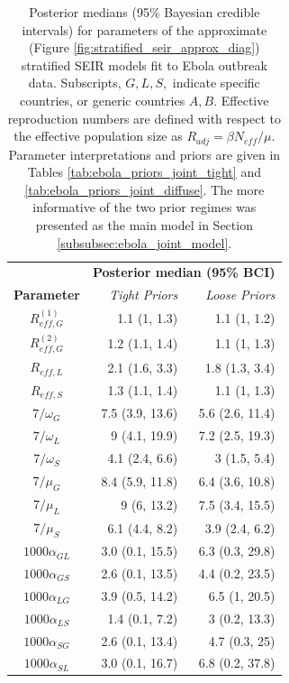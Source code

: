 \begin{table}[htbp]
	\caption[Posterior parameter estimates for stratified SEIR models fit Ebola outbreak data.]{Posterior medians (95\% Bayesian credible intervals) for parameters of the approximate (Figure \ref{fig:stratified_seir_approx_diag}) stratified SEIR models fit to Ebola outbreak data. Subscripts, $ G,L,S, $ indicate specific countries, or generic countries $ A,B $. Effective reproduction numbers are defined with respect to the effective population size as $ R_{adj} = \beta N_{eff} /\mu $. Parameter interpretations and priors are given in Tables \ref{tab:ebola_priors_joint_tight} and \ref{tab:ebola_priors_joint_diffuse}. The more informative of the two prior regimes was presented as the main model in Section \ref{subsubsec:ebola_joint_model}.}
	\label{tab:ebola_joint_ests}
	\centering\footnotesize
	\begin{tabular}{crr}
		\hline
		& \multicolumn{2}{c}{\textbf{Posterior median (95\% BCI)}}\\\cline{2-3}
		\textbf{Parameter} & \textit{Tight Priors} & \textit{Loose Priors} \\ 
		\hline
		$ R_{eff,G}^{(1)} $& 1.1 (1, 1.3) & 1.1 (1, 1.2) \\ 
		$ R_{eff,G}^{(2)} $& 1.2 (1.1, 1.4) & 1.1 (1, 1.3) \\ 
		$ R_{eff,L} $& 2.1 (1.6, 3.3) & 1.8 (1.3, 3.4) \\ 
		$ R_{eff,S} $& 1.3 (1.1, 1.4) & 1.1 (1, 1.3) \\ 
		$ 7/\omega_G $& 7.5 (3.9, 13.6) & 5.6 (2.6, 11.4) \\ 
		$ 7/\omega_L $& 9 (4.1, 19.9) & 7.2 (2.5, 19.3) \\ 
		$ 7/\omega_S $& 4.1 (2.4, 6.6) & 3 (1.5, 5.4) \\ 
		$ 7/\mu_G $& 8.4 (5.9, 11.8) & 6.4 (3.6, 10.8) \\ 
		$ 7/\mu_L $& 9 (6, 13.2) & 7.5 (3.4, 15.5) \\ 
		$ 7/\mu_S $& 6.1 (4.4, 8.2) & 3.9 (2.4, 6.2) \\ 
		$ 1000\alpha_{GL} $& 3.0 (0.1, 15.5) & 6.3 (0.3, 29.8) \\ 
		$ 1000\alpha_{GS} $& 2.6 (0.1, 13.5) & 4.4 (0.2, 23.5) \\ 
		$ 1000\alpha_{LG} $& 3.9 (0.5, 14.2) & 6.5 (1, 20.5) \\ 
		$ 1000\alpha_{LS} $& 1.4 (0.1, 7.2) & 3 (0.2, 13.3) \\ 
		$ 1000\alpha_{SG} $& 2.6 (0.1, 13.4) & 4.7 (0.3, 25) \\ 
		$ 1000\alpha_{SL} $& 3.0 (0.1, 16.7) & 6.8 (0.2, 37.8) \\ 

\end{tabular}
\end{table}
